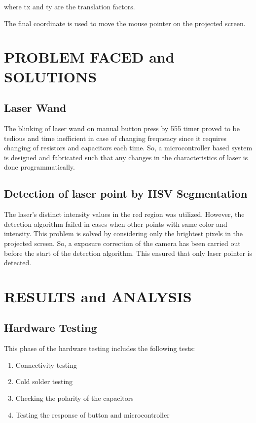 \documentclass[12pt, a4paper]{article}
\begin{document}
where tx and ty are the translation factors.

The final coordinate is used to move the mouse pointer on the projected screen. 
\newpage
\section{PROBLEM FACED and SOLUTIONS}
\subsection{Laser Wand}

The blinking of laser wand on manual button press by 555 timer proved to be tedious and time inefficient in case of changing frequency since it requires changing of resistors and capacitors each time. So, a microcontroller based system is designed and fabricated such that any changes in the characteristics of laser is done programmatically. 

\subsection{Detection of laser point by HSV Segmentation}

The laser’s distinct intensity values in the red region was utilized. However, the detection algorithm failed in cases when other points with same color and intensity. This problem is solved by considering only the brightest pixels in the projected screen. So, a exposure correction of the camera has been carried out before the start of the detection algorithm. This ensured that only laser pointer is detected.
\newpage
\section{RESULTS and ANALYSIS}
\subsection{Hardware Testing}

This phase of the hardware testing includes the following tests:
\begin{enumerate}
\item Connectivity testing
\item Cold solder testing
\item Checking the polarity of the capacitors
\item Testing the response of button and microcontroller
\end{enumerate}
\end{document}
